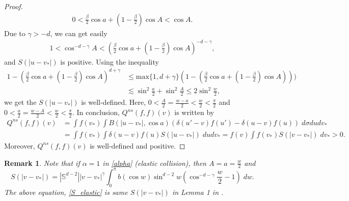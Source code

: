 \documentclass[reqno,10pt]{amsart}
\newtheorem{remark}[theorem]{Remark}
\numberwithin{equation}{section}
\begin{document}
\begin{proof}
\begin{align*}
    0 < \frac{\beta}{2}\cos a + (1-\frac{\beta}{2})\cos A < \cos A.
\end{align*} 
Due to $\gamma>-d$, we can get easily 
\begin{align*}
1< \cos^{-d-\gamma}A < (\frac{\beta}{2}\cos a + (1-\frac{\beta}{2})\cos A)^{-d-\gamma}, 
\end{align*} and $S(|u-v_*|)$ is positive. 
Using the inequality 
\begin{align*}
    1-(\frac{\beta}{2}\cos a + (1-\frac{\beta}{2})\cos A)^{d+\gamma} &\leq \text{max}\{1, d+\gamma\}(1-(\frac{\beta}{2}\cos a + (1-\frac{\beta}{2})\cos A))) \\
     &\lesssim \sin^{2}\frac{a}{2}+\sin^{2}\frac{A}{2}
 \leq 2\sin^{2}\frac{w}{2},
\end{align*} we get the $S(|u-v_*|)$ is well-defined. Here, $0<\frac{A}{2}=\frac{w-a}{2}<\frac{w}{2}<\frac{\pi}{2}$ and $0<\frac{a}{2}=\frac{w-A}{2}<\frac{w}{2}<\frac{\pi}{2}$. In conclusion, $Q^{ns}(f, f)(v)$ is written by  
\begin{align*}
    Q^{ns}(f, f)(v) &= \int f(v_*)\int B(|u-v_*|, \cos a)(\delta(u'-v)f(u')-\delta(u-v)f(u)) \; d\sigma du dv_* \\&=\int f(v_*) \int \delta(u-v)f(u)S(|u-v_*|) \;dudv_*=f(v)\int f(v_*)S(|v-v_*|)  \;dv_* > 0.
\end{align*}
Moreover, $Q^{ns}(f,f)(v)$ is well-defined and positive.  
\end{proof} 

\begin{remark}
Note that if $\alpha = 1$ in \eqref{alpha} (elastic collision), then $A=a=\frac{w}{2}$ and 
\begin{equation} \label{S_elastic}
      S(|v-v_*|)=|\mathbb{S}^{d-2}||v-v_*|^{\gamma}\int_0^\pi b(\cos w)\sin^{d-2}w(\cos^{-d-\gamma}\frac{w}{2}-1) \;dw.
\end{equation} The above equation, \eqref{S_elastic} is same $S(|v-v_*|)$ in Lemma 1 in \cite{AD2000}.  \\
\end{remark}
\end{document}
